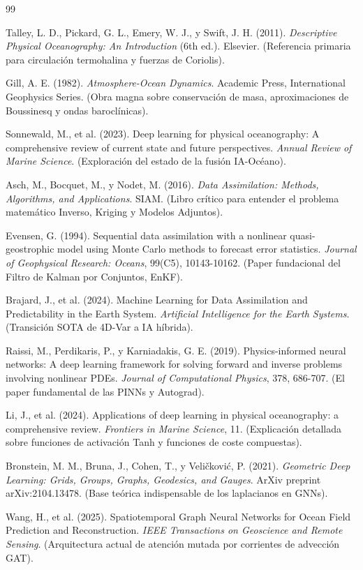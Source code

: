 \documentclass[11pt,a4paper]{article}
\begin{document}
\vspace{1cm}
\begin{thebibliography}{99}

Talley, L. D., Pickard, G. L., Emery, W. J., y Swift, J. H. (2011).
\textit{Descriptive Physical Oceanography: An Introduction} (6th ed.).
Elsevier. (Referencia primaria para circulación termohalina y fuerzas de Coriolis).

Gill, A. E. (1982).
\textit{Atmosphere-Ocean Dynamics}.
Academic Press, International Geophysics Series. (Obra magna sobre conservación de masa, aproximaciones de Boussinesq y ondas baroclínicas).

Sonnewald, M., et al. (2023).
Deep learning for physical oceanography: A comprehensive review of current state and future perspectives.
\textit{Annual Review of Marine Science}. (Exploración del estado de la fusión IA-Océano).

Asch, M., Bocquet, M., y Nodet, M. (2016).
\textit{Data Assimilation: Methods, Algorithms, and Applications}.
SIAM. (Libro crítico para entender el problema matemático Inverso, Kriging y Modelos Adjuntos).

Evensen, G. (1994).
Sequential data assimilation with a nonlinear quasi-geostrophic model using Monte Carlo methods to forecast error statistics.
\textit{Journal of Geophysical Research: Oceans}, 99(C5), 10143-10162. (Paper fundacional del Filtro de Kalman por Conjuntos, EnKF).

Brajard, J., et al. (2024).
Machine Learning for Data Assimilation and Predictability in the Earth System.
\textit{Artificial Intelligence for the Earth Systems}. (Transición SOTA de 4D-Var a IA híbrida).

Raissi, M., Perdikaris, P., y Karniadakis, G. E. (2019).
Physics-informed neural networks: A deep learning framework for solving forward and inverse problems involving nonlinear PDEs.
\textit{Journal of Computational Physics}, 378, 686-707. (El paper fundamental de las PINNs y Autograd).

Li, J., et al. (2024).
Applications of deep learning in physical oceanography: a comprehensive review.
\textit{Frontiers in Marine Science}, 11. (Explicación detallada sobre funciones de activación Tanh y funciones de coste compuestas).

Bronstein, M. M., Bruna, J., Cohen, T., y Veličković, P. (2021).
\textit{Geometric Deep Learning: Grids, Groups, Graphs, Geodesics, and Gauges}.
ArXiv preprint arXiv:2104.13478. (Base teórica indispensable de los laplacianos en GNNs).

Wang, H., et al. (2025).
Spatiotemporal Graph Neural Networks for Ocean Field Prediction and Reconstruction.
\textit{IEEE Transactions on Geoscience and Remote Sensing}. (Arquitectura actual de atención mutada por corrientes de advección GAT).

\end{thebibliography}
\end{document}
